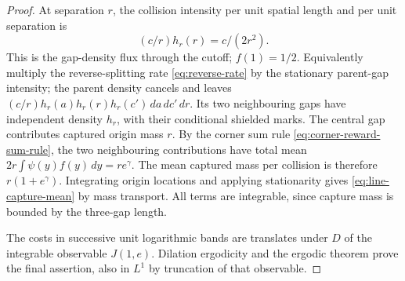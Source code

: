 \documentclass[11pt,letterpaper]{article}
\begin{document}
\begin{proof}
At separation $r$, the collision intensity per unit spatial length
and per unit separation is
\[
 (c/r)h_r(r)=c/(2r^2).
\]
This is the gap-density flux through the cutoff; $f(1)=1/2$.
Equivalently multiply the reverse-splitting rate
\eqref{eq:reverse-rate} by the stationary parent-gap intensity;
the parent density cancels and leaves
$(c/r)h_r(a)h_r(r)h_r(c')\,da\,dc'\,dr$.
Its two neighbouring gaps have independent density $h_r$, with
their conditional shielded marks. The central gap contributes
captured origin mass $r$. By the corner sum rule
\eqref{eq:corner-reward-sum-rule}, the two neighbouring contributions
have total mean $2r\int\psi(y)f(y)\,dy=r e^\gamma$.
The mean captured mass per collision is therefore $r(1+e^\gamma)$.
Integrating origin locations and applying stationarity gives
\eqref{eq:line-capture-mean} by mass transport. All terms are
integrable, since capture mass is bounded by the three-gap length.

The costs in successive unit logarithmic bands are translates
under $D$ of the integrable observable $J(1,e)$. Dilation ergodicity
and the ergodic theorem prove the final assertion, also in $L^1$
by truncation of that observable.
\end{proof}
\end{document}
